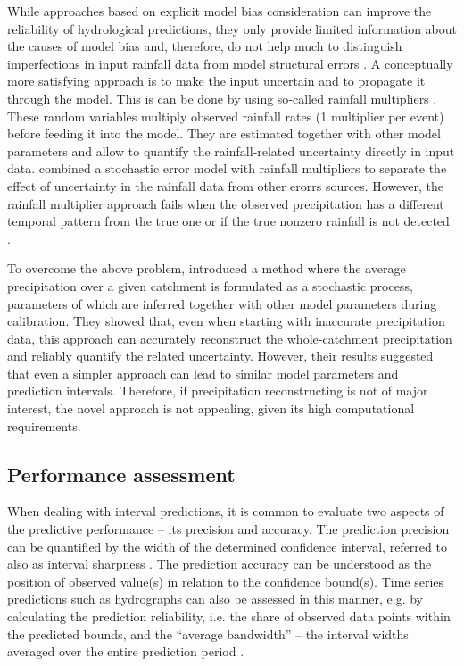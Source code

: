 \documentclass{ctuthesis}\usepackage[]{graphicx}\usepackage[]{color}
\begin{document}
While approaches based on explicit model bias consideration can improve the reliability of hydrological predictions, they only provide limited information about the causes of model bias and, therefore, do not help much to distinguish imperfections in input rainfall data from model structural errors \citep{giudice2013improving}. A conceptually more satisfying approach is to make the input uncertain and to propagate it through the model. This is can be done by using so‐called rainfall multipliers \citep{kavetskiBayesianAnalysisInput2006, vrugtTreatmentInputUncertainty2008}. These random variables multiply observed rainfall rates (1 multiplier per event) before feeding it into the model. They are estimated together
with other model parameters and allow to quantify the rainfall‐related uncertainty directly in input data. \cite{sikorskaBayesianUncertaintyAssessment2012} combined a stochastic error model with rainfall multipliers to separate the effect of uncertainty in the rainfall data from other erorrs sources. However, the rainfall multiplier approach fails when the observed precipitation has a different temporal pattern from the true one or if the true nonzero rainfall is not detected \citep{delgiudiceDescribingCatchmentaveragedPrecipitation2016}. 

To overcome the above problem, \cite{delgiudiceDescribingCatchmentaveragedPrecipitation2016} introduced a method where the average precipitation over a given catchment is formulated as a stochastic process, parameters of which are inferred together with other model parameters during calibration. They showed that, even when starting with inaccurate precipitation data, this approach can accurately reconstruct the whole‐catchment precipitation and reliably quantify the related uncertainty. However, their results suggested that even a simpler approach \citep[e.g.][]{giudice2013improving} can lead to similar model parameters and prediction intervals. Therefore, if precipitation reconstructing is not of major interest, the novel approach is not appealing, given its high computational requirements.


\subsection{Performance assessment} \label{PerAsses}

When dealing with interval predictions, it is common to evaluate two aspects of the predictive performance -- its precision and accuracy. The prediction precision can be quantified by the width of the determined confidence interval, referred to also as interval sharpness \mbox{\citep[e.g.][]{breinholt2012formal}}. The prediction accuracy can be understood as the position of observed value(s) in relation to the confidence bound(s). Time series predictions such as hydrographs can also  be assessed in this manner, e.g. by calculating the prediction reliability, i.e. the share of observed data points within the predicted bounds, and the \enquote{average bandwidth} --  the interval widths averaged over the entire prediction period \citep{giudice2013improving}.
\end{document}
